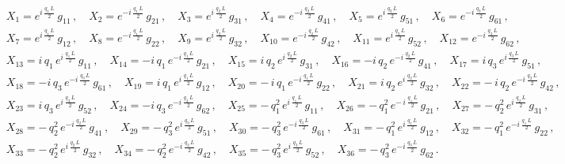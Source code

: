 \documentclass[aps,prb,onecolumn,longbibliography,nofootinbib,citeautoscript,10pt]{revtex4-2}
\def \nn{\nonumber \\}
\def\nn{\nonumber \\}
\def \nn{\nonumber \\}
\begin{document}
\begin{align}
& X_1  = e^{ i \, \frac{ q_1 \, L} {2}} \, g_{11}   \,,  \quad 
X_2  = e^{- i \, \frac{ q_1 \, L} {2}} \, g_{21}   \,,  \quad X_3  = e^{ i \, \frac{ q_2 \, L} {2}} \, g_{31}   \,,  \quad X_4  = e^{- i \, \frac{ q_2 \, L} {2}} \, g_{41}   \,,  \quad X_5  = e^{ i \, \frac{ q_3 \, L} {2}} \, g_{51}   \,,  \quad X_6  = e^{- i \, \frac{ q_3 \, L} {2}} \, g_{61} \,, \nn
& X_7  = e^{ i \, \frac{ q_1 \, L} {2}} \, g_{12}   \,,  \quad 
X_8  = e^{- i \, \frac{ q_1 \, L} {2}} \, g_{22}   \,,  \quad X_9  = e^{ i \, \frac{ q_2 \, L} {2}} \, g_{32}   \,,  \quad 
X_{10}  = e^{- i \, \frac{ q_2 \, L} {2}} \, g_{42}   \,,  
\quad X_{11}  = e^{ i \, \frac{ q_3 \, L} {2}} \, g_{52}   \,,  \quad
 X_{12}  = e^{- i \, \frac{ q_3 \, L} {2}} \, g_{62} \,, \nn &
X_{13}  =  i \, q_1 \, e^{ i \, \frac{ q_1 \, L} {2}} \, g_{11}   \,,  
\quad X_{14}  = - i \, q_1 \, e^{- i \, \frac{ q_1 \, L} {2}} \, g_{21}   \,,  
\quad X_{15}  =  i \, q_2 \, e^{ i \, \frac{ q_2 \, L} {2}} \, g_{31}   \,,  
\quad X_{16}  = - i \, q_2 \, e^{- i \, \frac{ q_2 \, L} {2}} \, g_{41}   \,,  \quad X_{17} 
=  i \, q_3 \, e^{ i \, \frac{ q_3 \, L} {2}} \, g_{51}   \,,  \nn &
 X_{18}  = - i \, q_3 \, e^{- i \, \frac{ q_3 \, L} {2}} \, g_{61} \,,  \quad
X_{19} =  i \, q_1 \, e^{ i \, \frac{ q_1 \, L} {2}} \, g_{12}   \,,  
\quad X_{20}  = - \,i \, q_1 \, e^{- i \, \frac{ q_1 \, L} {2}} \, g_{22}   \,,  
\quad X_{21}  =  i \, q_2 \, e^{ i \, \frac{ q_2 \, L} {2}} \, g_{32}   \,,  
\quad X_{22}  = - \,i \, q_2 \, e^{- i \, \frac{ q_2 \, L} {2}} \, g_{42}   \,,  \nn & X_{23} =  i \, q_3 \, e^{ i \, \frac{ q_3 \, L} {2}} \, g_{52}   \,,  
\quad X_{24}  = - i \, q_3 \, e^{- i \, \frac{ q_3 \, L} {2}} \, g_{62} \,, \quad
X_{25}  = - \,q_1^2\, e^{ i \, \frac{ q_1 \, L} {2}} \, g_{11}   \,,  
\quad X_{26}  = - \,q_1^2\, e^{- \, i \, \frac{ q_1 \, L} {2}} \, g_{21}   \,,  \quad 
X_{27}  = -\, q_2^2\, e^{ i \, \frac{ q_2 \, L} {2}} \, g_{31}   \,, \nn &
 X_{28}  = -\, q_2^2\, e^{- i \, \frac{ q_2 \, L} {2}} \, g_{41}   \,,  
 \quad X_{29}  = - \,q_3^2\, e^{ i \, \frac{ q_3 \, L} {2}} \, g_{51}   \,,  
 \quad X_{30}  = - \,q_3^2\, e^{- i \, \frac{ q_3 \, L} {2}} \, g_{61} \,, \quad 
 X_{31}  = -\, q_1^2\, e^{ i \, \frac{ q_1 \, L} {2}} \, g_{12}   \,,  
\quad X_{32}  = - \,q_1^2\, e^{- i \, \frac{ q_1 \, L} {2}} \, g_{22}   \,,  
\nn & X_{33}  = - \,q_2^2\, e^{ i \, \frac{ q_2 \, L} {2}} \, g_{32}   \,,  
\quad X_{34}  = -\, q_2^2\, e^{- i \, \frac{ q_2 \, L} {2}} \, g_{42}   \,,  
\quad X_{35}  = - \,q_3^2\, e^{ i \, \frac{ q_3 \, L} {2}} \, g_{52}   \,,  \quad 
X_{36}  = -\, q_3^2\, e^{- i \, \frac{ q_3 \, L} {2}} \, g_{62} \,.
\end{align}
\end{document}
